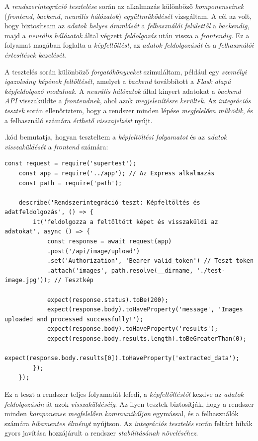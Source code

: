 \documentclass[
]{thesis-ekf}
\theoremstyle{definition}
\theoremstyle{remark}
\begin{document}
A \emph{rendszerintegráció tesztelése} során az alkalmazás különböző \emph{komponenseinek} (\emph{frontend}, \emph{backend}, \emph{neurális hálózatok}) \emph{együttműködését} vizsgáltam. A cél az volt, hogy biztosítsam az \emph{adatok helyes áramlását} a \emph{felhasználói felülettől} a \emph{backendig}, majd a \emph{neurális hálózatok} által végzett \emph{feldolgozás} után vissza a \emph{frontendig}. Ez a folyamat magában foglalta a \emph{képfeltöltést}, az \emph{adatok feldolgozását} és a \emph{felhasználói értesítések kezelését}.

A tesztelés során különböző \emph{forgatókönyveket} szimuláltam, például egy \emph{személyi igazolvány képének feltöltését}, amelyet a \emph{backend} továbbított a \emph{Flask alapú képfeldolgozó modulnak}. A \emph{neurális hálózatok} által kinyert adatokat a \emph{backend API} visszaküldte a \emph{frontendnek}, ahol azok \emph{megjelenítésre kerültek}. Az \emph{integrációs tesztek} során ellenőriztem, hogy a rendszer minden lépése \emph{megfelelően működik}, és a felhasználó számára \emph{érthető visszajelzést} nyújt.

.kód bemutatja, hogyan teszteltem a \emph{képfeltöltési folyamatot} és az \emph{adatok visszaküldését} a \emph{frontend} számára:

\begin{lstlisting}[style=myjavascript, caption={Rendszerintegráció tesztelés}, label=kod-javascript3]
	const request = require('supertest');
	const app = require('../app'); // Az Express alkalmazás
	const path = require('path');
	
	describe('Rendszerintegráció teszt: Képfeltöltés és adatfeldolgozás', () => {
		it('feldolgozza a feltöltött képet és visszaküldi az adatokat', async () => {
			const response = await request(app)
			.post('/api/image/upload')
			.set('Authorization', 'Bearer valid_token') // Teszt token
			.attach('images', path.resolve(__dirname, './test-image.jpg')); // Tesztkép
			
			expect(response.status).toBe(200);
			expect(response.body).toHaveProperty('message', 'Images uploaded and processed successfully!');
			expect(response.body).toHaveProperty('results');
			expect(response.body.results.length).toBeGreaterThan(0);
			expect(response.body.results[0]).toHaveProperty('extracted_data');
		});
	});
\end{lstlisting}

Ez a teszt a rendszer teljes folyamatát lefedi, a \emph{képfeltöltéstől} kezdve az \emph{adatok feldolgozásán} át azok \emph{visszaküldéséig}. Az ilyen tesztek biztosítják, hogy a rendszer minden \emph{komponense megfelelően kommunikáljon} egymással, és a felhasználók számára \emph{hibamentes élményt} nyújtson. Az \emph{integrációs tesztelés} során feltárt hibák gyors javítása hozzájárult a rendszer \emph{stabilitásának növeléséhez}.
\end{document}
